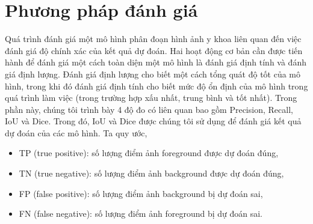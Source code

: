 \section{Phương pháp đánh giá} 
\label{sec:phuong_phap_danh_gia}
	Quá trình đánh giá một mô hình phân đoạn hình ảnh y khoa liên quan đến việc đánh giá độ chính xác của kết quả dự đoán. Hai hoạt động cơ bản cần được tiến hành để đánh giá một cách toàn diện một mô hình là đánh giá định tính và đánh giá định lượng. Đánh giá định lượng cho biết một cách tổng quát độ tốt của mô hình, trong khi đó đánh giá định tính cho biết mức độ ổn định của mô hình trong quá trình làm việc (trong trường hợp xấu nhất, trung bình và tốt nhất). Trong phần này, chúng tôi trình bày 4 độ đo có liên quan bao gồm Precision, Recall, IoU và Dice. Trong đó, IoU và Dice được chúng tôi sử dụng để đánh giá kết quả dự đoán của các mô hình.
\newpage
	Ta quy ước,
	\begin{itemize}
		\item TP (true positive): số lượng điểm ảnh foreground được dự đoán đúng,
		\item TN (true negative): số lượng điểm ảnh background được dự đoán đúng,
		\item FP (false positive): số lượng điểm ảnh background bị dự đoán sai,
		\item FN (false negative): số lượng điểm ảnh foreground bị dự đoán sai.
	\end{itemize}
